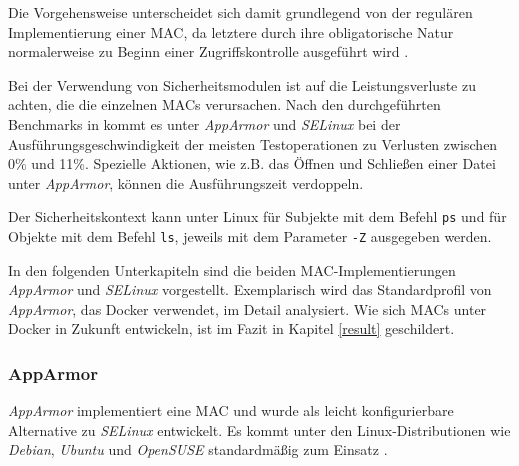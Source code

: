\documentclass[../main.tex]{subfiles}
\begin{document}
			Die Vorgehensweise unterscheidet sich damit grundlegend von der regulären Implementierung einer MAC, da letztere durch ihre obligatorische Natur normalerweise zu Beginn einer Zugriffskontrolle ausgeführt wird \cite[S.3]{LSMFramework}.


			Bei der Verwendung von Sicherheitsmodulen ist auf die Leistungsverluste zu achten, die die einzelnen MACs verursachen. Nach den durchgeführten Benchmarks in \cite[S.51ff.]{SELinuxApparmor} kommt es unter \emph{AppArmor} und \emph{SELinux} bei der Ausführungsgeschwindigkeit der meisten Testoperationen zu Verlusten zwischen 0\% und 11\%. Spezielle Aktionen, wie z.B. das Öffnen und Schließen einer Datei unter \emph{AppArmor}, können die Ausführungszeit verdoppeln.



			Der Sicherheitskontext kann unter Linux für Subjekte mit dem Befehl \texttt{ps} und für Objekte mit dem Befehl \texttt{ls}, jeweils mit dem Parameter \texttt{-Z} ausgegeben werden.








			In den folgenden Unterkapiteln sind die beiden MAC-Implementierungen \emph{AppArmor} und \emph{SELinux} vorgestellt. Exemplarisch wird das Standardprofil von \emph{AppArmor}, das Docker verwendet, im Detail analysiert. Wie sich MACs unter Docker in Zukunft entwickeln, ist im Fazit in Kapitel \ref{result} geschildert.

			\subsubsection{\acrshort{AppArmor}}
			\label{apparmor}
				\emph{AppArmor} implementiert eine MAC und wurde als leicht konfigurierbare Alternative zu \emph{SELinux} entwickelt. Es kommt unter den Linux-Distributionen wie \emph{Debian}, \emph{Ubuntu} und \emph{OpenSUSE} standardmäßig zum Einsatz \cite{apparmorUbuntu}.
\end{document}
